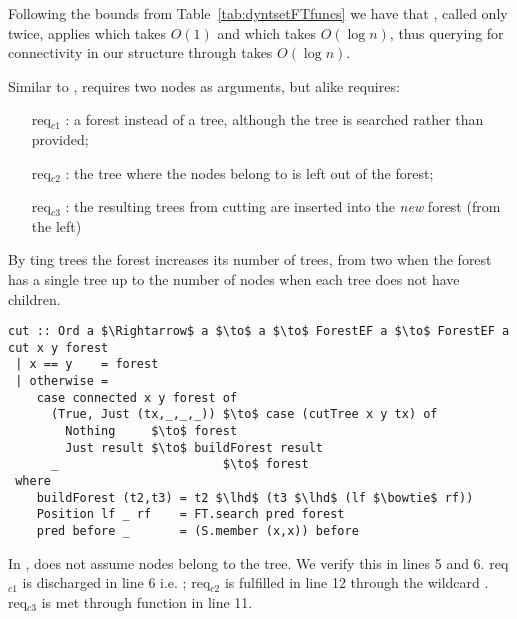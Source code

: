 Following the bounds from Table~\ref{tab:dyntsetFTfuncs} we have that , called only twice, applies  which takes $O(1)$ and  which takes $O(\log n)$, thus querying for connectivity in our structure through \conn takes $O(\log n)$. 

Similar to , \cut requires two nodes as arguments, but alike  requires:
\begin{itemize}
\item [req$_{c1}$]: a forest instead of a tree, although the tree is searched rather than provided;
\item [req$_{c2}$]: the tree where the nodes belong to is left out of the forest;
\item [req$_{c3}$]: the resulting trees from cutting are inserted into the \textit{new} forest (from the left)
\end{itemize}

By {\cut}ting trees the forest increases its number of trees, from two when the forest has a single tree up to the number of nodes when each tree does not have children.

\begin{lstlisting}[mathescape] 
cut :: Ord a $\Rightarrow$ a $\to$ a $\to$ ForestEF a $\to$ ForestEF a 
cut x y forest  
 | x == y    = forest  
 | otherwise = 
    case connected x y forest of 
      (True, Just (tx,_,_,_)) $\to$ case (cutTree x y tx) of
        Nothing     $\to$ forest 
        Just result $\to$ buildForest result  
      _                       $\to$ forest 
 where 
    buildForest (t2,t3) = t2 $\lhd$ (t3 $\lhd$ (lf $\bowtie$ rf)) 
    Position lf _ rf    = FT.search pred forest
    pred before _       = (S.member (x,x)) before
\end{lstlisting} 

In \dyntset, \cut does not assume nodes belong to the tree. We verify this in lines 5 and 6. req$_{c1}$ is discharged in line 6 i.e. ; req$_{c2}$ is fulfilled in line 12 through the wildcard \code{_}. req$_{c3}$ is met through  function in line 11. 


